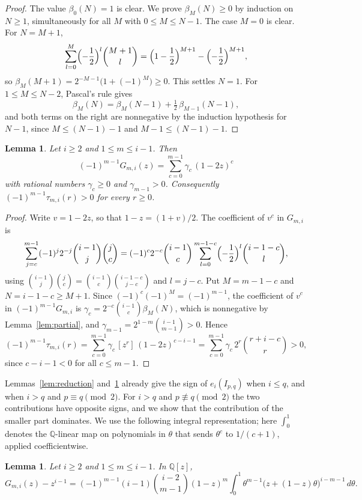\documentclass{amsart}
\newtheorem{lemma}[theorem]{Lemma}
\theoremstyle{definition}
\theoremstyle{remark}
\numberwithin{equation}{section}
\newcommand{\QQ}{\mathbb{Q}}
\newcommand{\cf}[1]{[#1]\,}
\begin{document}
\begin{proof}
The value $\beta_0(N)=1$ is clear. We prove $\beta_M(N)\ge0$ by induction on
$N\ge1$, simultaneously for all $M$ with $0\le M\le N-1$. The case $M=0$ is
clear. For $N=M+1$,
\[
  \sum_{l=0}^{M}\Bigl(-\frac12\Bigr)^l\binom{M+1}{l}
  =\Bigl(1-\frac12\Bigr)^{M+1}-\Bigl(-\frac12\Bigr)^{M+1},
\]
so $\beta_M(M+1)=2^{-M-1}\bigl(1+(-1)^M\bigr)\ge0$. This settles $N=1$. For
$1\le M\le N-2$, Pascal's rule gives
\[
  \beta_M(N)=\beta_M(N-1)+\tfrac12\,\beta_{M-1}(N-1),
\]
and both terms on the right are nonnegative by the induction hypothesis for
$N-1$, since $M\le (N-1)-1$ and $M-1\le(N-1)-1$.
\end{proof}

\begin{lemma}\label{lem:positive}
Let $i\ge2$ and $1\le m\le i-1$. Then
\[
  (-1)^{m-1}G_{m,i}(z)=\sum_{c=0}^{m-1}\gamma_c\,(1-2z)^c
\]
with rational numbers $\gamma_c\ge0$ and $\gamma_{m-1}>0$. Consequently
$(-1)^{m-1}\tau_{m,i}(r)>0$ for every $r\ge0$.
\end{lemma}

\begin{proof}
Write $v=1-2z$, so that $1-z=(1+v)/2$. The coefficient of $v^c$ in $G_{m,i}$ is
\[
  \sum_{j=c}^{m-1}(-1)^j2^{-j}\binom{i-1}{j}\binom{j}{c}
  =(-1)^c2^{-c}\binom{i-1}{c}\sum_{l=0}^{m-1-c}\Bigl(-\frac12\Bigr)^l\binom{i-1-c}{l},
\]
using $\binom{i-1}{j}\binom{j}{c}=\binom{i-1}{c}\binom{i-1-c}{j-c}$ and $l=j-c$.
Put $M=m-1-c$ and $N=i-1-c\ge M+1$. Since $(-1)^c(-1)^M=(-1)^{m-1}$, the
coefficient of $v^c$ in $(-1)^{m-1}G_{m,i}$ is
$\gamma_c=2^{-c}\binom{i-1}{c}\beta_M(N)$, which is nonnegative by
Lemma~\ref{lem:partial}, and $\gamma_{m-1}=2^{1-m}\binom{i-1}{m-1}>0$. Hence
\[
  (-1)^{m-1}\tau_{m,i}(r)=\sum_{c=0}^{m-1}\gamma_c\,\cf{z^r}(1-2z)^{c-i-1}
  =\sum_{c=0}^{m-1}\gamma_c\,2^r\binom{r+i-c}{r}>0,
\]
since $c-i-1<0$ for all $c\le m-1$.
\end{proof}

Lemmas~\ref{lem:reduction} and~\ref{lem:positive} already give the sign of
$e_i(I_{p,q})$ when $i\le q$, and when $i>q$ and $p\equiv q\pmod 2$. For $i>q$
and $p\not\equiv q\pmod 2$ the two contributions have opposite signs, and we
show that the contribution of the smaller part dominates. We use the following
integral representation; here $\int_0^1$ denotes the $\QQ$-linear map on
polynomials in $\theta$ that sends $\theta^c$ to $1/(c+1)$, applied coefficientwise.

\begin{lemma}\label{lem:integral}
Let $i\ge2$ and $1\le m\le i-1$. In $\QQ[z]$,
\[
  G_{m,i}(z)-z^{i-1}=(-1)^{m-1}(i-1)\binom{i-2}{m-1}(1-z)^m
  \int_0^1 \theta^{m-1}\bigl(z+(1-z)\theta\bigr)^{i-m-1}\,d\theta.
\]
\end{lemma}
\end{document}
